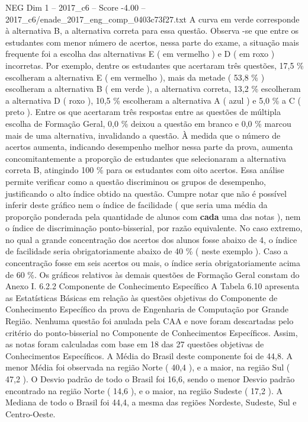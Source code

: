 \begin{textsample}{NEG Dim 1 – 2017\_c6 – Score -4.00 – 2017\_c6/enade\_2017\_eng\_comp\_0403c73f27.txt}
A curva em verde corresponde à alternativa B, a alternativa correta para essa questão.
Observa -se que entre os estudantes com menor número de acertos, nessa parte do exame, a situação mais frequente foi a escolha das alternativas E ( em vermelho ) e D ( em roxo ) incorretas.
Por exemplo, dentre os estudantes que acertaram três questões, 17,5 \% escolheram a alternativa E ( em vermelho ), mais da metade ( 53,8 \% ) escolheram a alternativa B ( em verde ), a alternativa correta, 13,2 \% escolheram a alternativa D ( roxo ), 10,5 \% escolheram a alternativa A ( azul ) e 5,0 \% a C ( preto ).
Entre os que acertaram três respostas entre as questões de múltipla escolha de Formação Geral, 0,0 \% deixou a questão em branco e 0,0 \% marcou mais de uma alternativa, invalidando a questão.
À medida que o número de acertos aumenta, indicando desempenho melhor nessa parte da prova, aumenta concomitantemente a proporção de estudantes que selecionaram a alternativa correta B, atingindo 100 \% para os estudantes com oito acertos.
Essa análise permite verificar como a questão discriminou os grupos de desempenho, justificando o alto índice obtido na questão.
Cumpre notar que não é possível inferir deste gráfico nem o índice de facilidade ( que seria uma média da proporção ponderada pela quantidade de alunos com \textbf{cada} uma das notas ), nem o índice de discriminação ponto-bisserial, por razão equivalente.
No caso extremo, no qual a grande concentração dos acertos dos alunos fosse abaixo de 4, o índice de facilidade seria obrigatoriamente abaixo de 40 \% ( neste exemplo ).
Caso a concentração fosse em seis acertos ou mais, o índice seria obrigatoriamente acima de 60 \%.
Os gráficos relativos às demais questões de Formação Geral constam do Anexo I. 6.2.2 Componente de Conhecimento Específico A Tabela 6.10 apresenta as Estatísticas Básicas em relação às questões objetivas do Componente de Conhecimento Específico da prova de Engenharia de Computação por Grande Região.
Nenhuma questão foi anulada pela CAA e nove foram descartadas pelo critério do ponto-bisserial no Componente de Conhecimentos Específicos.
Assim, as notas foram calculadas com base em 18 das 27 questões objetivas de Conhecimentos Específicos.
A Média do Brasil deste componente foi de 44,8.
A menor Média foi observada na região Norte ( 40,4 ), e a maior, na região Sul ( 47,2 ).
O Desvio padrão de todo o Brasil foi 16,6, sendo o menor Desvio padrão encontrado na região Norte ( 14,6 ), e o maior, na região Sudeste ( 17,2 ).
A Mediana de todo o Brasil foi 44,4, a mesma das regiões Nordeste, Sudeste, Sul e Centro-Oeste.

\end{textsample}
